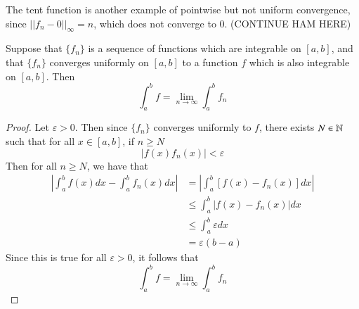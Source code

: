 The tent function is another example of pointwise but not uniform convergence, since $||f_n-0||_{\infty} = n$, which does not converge to $0$. (CONTINUE HAM HERE)


\begin{thm}
    Suppose that $\{f_n\}$ is a sequence of functions which are integrable on $[a,b]$, and that $\{f_n\}$ converges uniformly on $[a,b]$ to a function $f$ which is also integrable on $[a,b]$. Then \begin{equation*}
        \int_a^bf = \lim\limits_{n\rightarrow \infty}\int_a^bf_n
    \end{equation*}
\end{thm}
\begin{proof}
    Let $\varepsilon > 0$. Then since $\{f_n\}$ converges uniformly to $f$, there exists $N \in \mathbb N$ such that for all $x \in [a,b]$, if $n \geq N$ \begin{equation*}
        |f(x) f_n(x)| < \varepsilon
    \end{equation*}
    Then for all $n \geq N$, we have that \begin{align*}
        \left|\int_a^bf(x)dx - \int_a^bf_n(x)dx\right| &= \left|\int_a^b[f(x) - f_n(x)]dx\right| \\
        &\leq \int_a^b |f(x) - f_n(x)| dx \\
        &\leq \int_a^b\varepsilon dx \\
        &= \varepsilon (b-a)
    \end{align*}
    Since this is true for all $\varepsilon > 0$, it follows that \begin{equation*}
        \int_a^bf = \lim\limits_{n\rightarrow \infty}\int_a^bf_n
    \end{equation*}
\end{proof}



